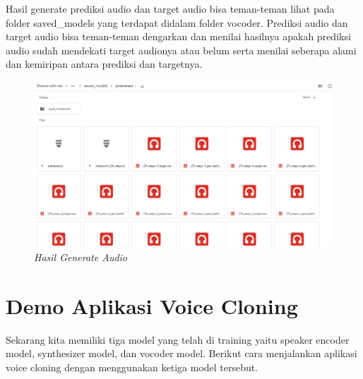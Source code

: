 \begin{enumerate}
Hasil generate prediksi audio dan target audio bisa teman-teman lihat pada folder saved\_models yang terdapat didalam folder vocoder. Prediksi audio dan target audio bisa teman-teman dengarkan dan menilai hasilnya apakah prediksi audio sudah mendekati target audionya atau belum serta menilai seberapa alami dan kemiripan antara prediksi dan targetnya.
\begin{figure}[H]
    \centering
    \includegraphics[scale=0.35]{figures/hasil29}
    \caption{\textit{Hasil Generate Audio}}
    \label{hasil29}
\end{figure}

\end{enumerate}

\section{Demo Aplikasi Voice Cloning}
Sekarang kita memiliki tiga model yang telah di training yaitu speaker encoder model, synthesizer model, dan vocoder model. Berikut cara menjalankan aplikasi voice cloning dengan menggunakan ketiga model tersebut.

